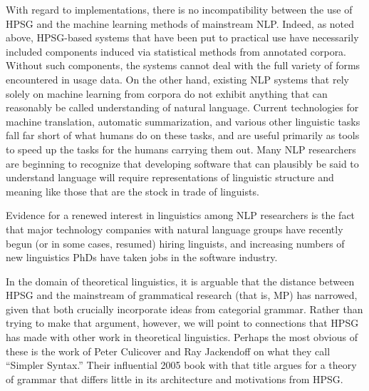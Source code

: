 \documentclass[output=paper]{langsci/langscibook}
\begin{document}
With regard to implementations, there is no incompatibility between the use of HPSG and the machine learning methods of mainstream NLP.  Indeed, as noted above, HPSG-based systems that have been put to practical use have necessarily included components induced via statistical methods from annotated corpora.  Without such components, the systems cannot deal with the full variety of forms encountered in usage data.  On the other hand, existing NLP systems that rely solely on machine learning from corpora do not exhibit anything that can reasonably be called understanding of natural language.  Current technologies for machine translation, automatic summarization, and various other linguistic tasks fall far short of what humans do on these tasks, and are useful primarily as tools to speed up the tasks for the humans carrying them out.  Many NLP researchers are beginning to recognize that developing software that can plausibly be said to understand language will require representations of linguistic structure and meaning like those that are the stock in trade of linguists.

Evidence for a renewed interest in linguistics among NLP researchers is the fact that major technology companies with natural language groups have recently begun (or in some cases, resumed) hiring linguists, and increasing numbers of new linguistics PhDs have taken jobs in the software industry.  

In the domain of theoretical linguistics, it is arguable that the distance between HPSG and the mainstream of grammatical research (that is, MP) has narrowed, given that both crucially incorporate ideas from categorial grammar.  Rather than trying to make that argument, however, we will point to connections that HPSG has made with other work in theoretical linguistics.  Perhaps the most obvious of these is the work of Peter Culicover and Ray Jackendoff on what they call ``Simpler Syntax.''  Their influential 2005 book with that title \citep{CJ2005a} argues for a theory of grammar that differs little in its architecture and motivations from HPSG.
\end{document}
